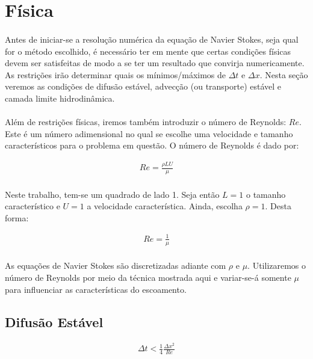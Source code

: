 \documentclass[fisica.tex]{subfiles}
\begin{document}
\section{Física}
\paragraph{} Antes de iniciar-se a resolução numérica da equação de Navier Stokes, seja qual for o método escolhido, é necessário ter em mente que certas condições físicas devem ser satisfeitas de modo a se ter um resultado que convirja numericamente. As restrições irão determinar quais os mínimos/máximos de $\Delta t$ e $\Delta x$. Nesta seção veremos as condições de difusão estável, advecção (ou transporte) estável e camada limite hidrodinâmica.

\paragraph{} Além de restrições físicas, iremos também introduzir o número de Reynolds: $\mathit{Re}$. Este é um número adimensional no qual se escolhe uma velocidade e tamanho característicos para o problema em questão. O número de Reynolds é dado por:

\begin{eqnarray}
\mathit{Re}=\frac{\rho L U}{\mu}
\end{eqnarray}

\paragraph{} Neste trabalho, tem-se um quadrado de lado 1. Seja então $L=1$ o tamanho característico e $U=1$ a velocidade característica. Ainda, escolha $\rho = 1$. Desta forma:

\begin{eqnarray}
\mathit{Re}=\frac{1}{\mu}
\end{eqnarray}
 
\paragraph{} As equações de Navier Stokes são discretizadas adiante com $\rho$ e $\mu$. Utilizaremos o número de Reynolds por meio da técnica mostrada aqui e variar-se-á somente $\mu$ para influenciar as características do escoamento.

\subsection{Difusão Estável}
\begin{eqnarray}
\Delta t < \frac{1}{4}\frac{\Delta x^2}{\mathit{Re}}
\end{eqnarray}
\end{document}
